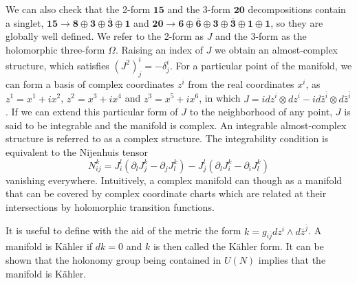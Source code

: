 We can also check that the 2-form $\mathbf {15}$ and the 3-form $\mathbf{20}$ decompositions contain a singlet, 
$\mathbf {15}\to \mathbf 8\oplus \mathbf 3\oplus \bar {\mathbf 3}\oplus \mathbf 1$ and 
$\mathbf {20}\to \mathbf 6\oplus \bar{\mathbf 6}\oplus\mathbf 3\oplus \bar {\mathbf 3}\oplus \mathbf 1\oplus \mathbf 1$,
so they are globally well defined.
We refer to the 2-form as $J$ and the 3-form as the holomorphic three-form $\Omega$.
Raising an index of $J$ we obtain an almost-complex structure, which satisfies $(J^2)^i_j=-\delta^i_j$.
For a particular point of the manifold, we can form a basis of complex coordinates $z^i$ from the real coordinates $x^i$,
as $z^1=x^1+ix^2$, $z^2=x^3+ix^4$ and $z^3=x^5+ix^6$,
in which $J=idz^i\otimes dz^i - i d\bar z^{\bar i}\otimes d\bar z^{\bar i}$.
If we can extend this particular form of $J$ to the neighborhood of any point, $J$ is said to be integrable
and the manifold is complex.
An integrable almost-complex structure is referred to as a complex structure. 
The integrability condition is equivalent to the Nijenhuis tensor 
\begin{equation}
  N^k_{ij}= J^l_i(\partial_l J^k_j - \partial_j J^k_l) - J_j^l (\partial_l J^k_i - \partial_i J^k_l)
\end{equation}
vanishing everywhere.
Intuitively, a complex manifold can though as a manifold that can be covered by
complex coordinate charts which are related at their intersections by holomorphic transition functions.

It is useful to define with the aid of the metric the form $k=g_{i\bar j} dz^i \wedge d\bar z^{\bar j}$.
A manifold is Kähler if $dk=0$ and $k$ is then called the Kähler form.
It can be shown that the holonomy group being contained in $U(N)$ implies that the manifold is Kähler.

